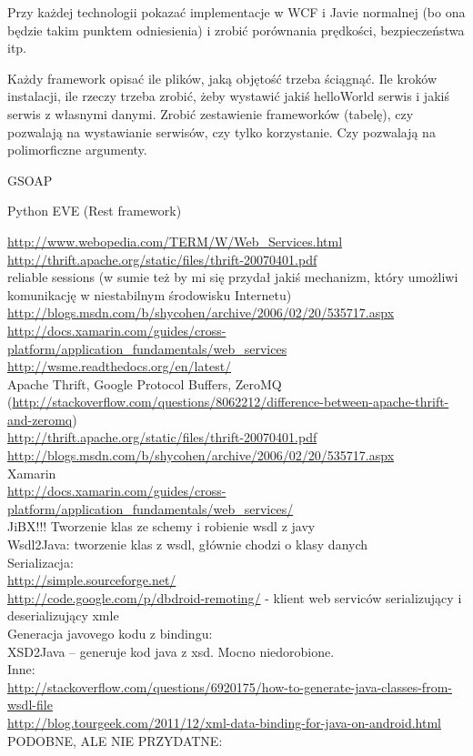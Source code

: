 Przy każdej technologii pokazać implementacje w WCF i Javie normalnej (bo ona będzie takim punktem odniesienia) i zrobić porównania prędkości, bezpieczeństwa itp.

Każdy framework opisać ile plików, jaką objętość trzeba ściągnąć. Ile kroków instalacji, ile rzeczy trzeba zrobić, żeby wystawić jakiś helloWorld serwis i jakiś serwis z własnymi danymi. Zrobić zestawienie frameworków (tabelę), czy pozwalają na wystawianie serwisów, czy tylko korzystanie. Czy pozwalają na polimorficzne argumenty.

GSOAP

Python EVE (Rest framework)

\url{http://www.webopedia.com/TERM/W/Web_Services.html}\\
\url{http://thrift.apache.org/static/files/thrift-20070401.pdf}\\
reliable sessions (w sumie też by mi się przydał jakiś mechanizm, który umożliwi komunikację w niestabilnym środowisku Internetu)\\
\url{http://blogs.msdn.com/b/shycohen/archive/2006/02/20/535717.aspx}\\
\url{http://docs.xamarin.com/guides/cross-platform/application_fundamentals/web_services}\\
\url{http://wsme.readthedocs.org/en/latest/}\\

Apache Thrift, Google Protocol Buffers, ZeroMQ (\url{http://stackoverflow.com/questions/8062212/difference-between-apache-thrift-and-zeromq})\\
\url{http://thrift.apache.org/static/files/thrift-20070401.pdf}\\
\url{http://blogs.msdn.com/b/shycohen/archive/2006/02/20/535717.aspx}\\
Xamarin\\
\url{http://docs.xamarin.com/guides/cross-platform/application_fundamentals/web_services/}\\

JiBX!!! Tworzenie klas ze schemy i robienie wsdl z javy\\
Wsdl2Java: tworzenie klas z wsdl, głównie chodzi o klasy danych\\

Serializacja:\\
\url{http://simple.sourceforge.net/}\\
\url{http://code.google.com/p/dbdroid-remoting/} - klient web serviców serializujący i deserializujący xmle\\
Generacja javovego kodu z bindingu:\\
XSD2Java – generuje kod java z xsd. Mocno niedorobione.\\
Inne:\\
\url{http://stackoverflow.com/questions/6920175/how-to-generate-java-classes-from-wsdl-file}\\
\url{http://blog.tourgeek.com/2011/12/xml-data-binding-for-java-on-android.html}\\
PODOBNE, ALE NIE PRZYDATNE:\\

